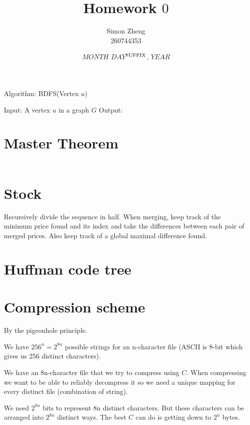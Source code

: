 \documentclass[11pt,letterpaper]{article}
\author{Simon Zheng\\260744353}
\title{Homework $0$}
\date{$MONTH$ $DAY$$^{\textnormal{SUFFIX}}$, $YEAR$}
\begin{document}
	\maketitle
	\thispagestyle{fancy}
	
	\section{}
		\begin{center}
			Algorithm: BDFS(Vertex $u$)
		\end{center}
		\begin{algorithm}[caption={}, label={alg1}]
			Input: A vertex $u$ in a graph $G$
			Output: 
			
			
		\end{algorithm}
	
	\section{Master Theorem}
		\begin{align*}
			\
		\end{align*}
	
	\section{Stock}
		Recursively divide the sequence in half.
		When merging, keep track of the minimum price found and its index and take the differences between each pair of merged prices.
		Also keep track of a global maximal difference found.
	
	\section{Huffman code tree}
		
	
	\section{Compression scheme}
		By the pigeonhole principle.
		
		We have $256^n = 2^{8n}$ possible strings for an n-character file (ASCII is 8-bit which gives us 256 distinct characters).
		
		We have an 8n-character file that we try to compress using $C$.
		When compressing we want to be able to reliably decompress it so we need a unique mapping for every distinct file (combination of string).
		
		We need $2^{8n}$ bits to represent 8n distinct characters.
		But these characters can be arranged into $2^{8n}$ distinct ways.
		The best $C$ can do is getting down to $2^n$ bytes.
		
\end{document}
